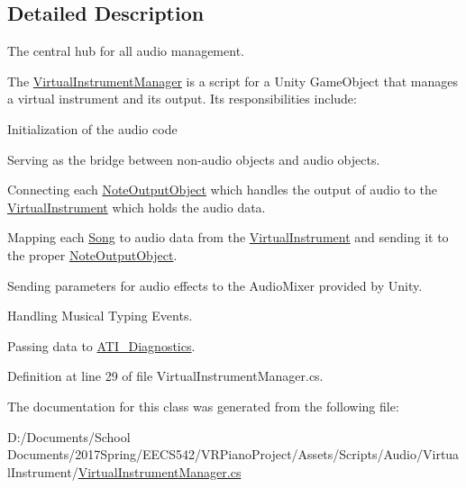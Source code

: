\subsection{Detailed Description}
The central hub for all audio management. 

The \hyperlink{class_virtual_instrument_manager}{Virtual\+Instrument\+Manager} is a script for a Unity Game\+Object that manages a virtual instrument and its output. Its responsibilities include\+: \begin{DoxyItemize}
\item Initialization of the audio code \item Serving as the bridge between non-\/audio objects and audio objects. \item Connecting each \hyperlink{class_note_output_object}{Note\+Output\+Object} which handles the output of audio to the \hyperlink{class_virtual_instrument}{Virtual\+Instrument} which holds the audio data. \item Mapping each \hyperlink{class_song}{Song} to audio data from the \hyperlink{class_virtual_instrument}{Virtual\+Instrument} and sending it to the proper \hyperlink{class_note_output_object}{Note\+Output\+Object}. \item Sending parameters for audio effects to the Audio\+Mixer provided by Unity. \item Handling Musical Typing Events. \item Passing data to \hyperlink{group___audio_testing_class_a_t_i___diagnostics}{A\+T\+I\+\_\+\+Diagnostics}. \end{DoxyItemize}


Definition at line 29 of file Virtual\+Instrument\+Manager.\+cs.



The documentation for this class was generated from the following file\+:\begin{DoxyCompactItemize}
\item 
D\+:/\+Documents/\+School Documents/2017\+Spring/\+E\+E\+C\+S542/\+V\+R\+Piano\+Project/\+Assets/\+Scripts/\+Audio/\+Virtual\+Instrument/\hyperlink{_virtual_instrument_manager_8cs}{Virtual\+Instrument\+Manager.\+cs}\end{DoxyCompactItemize}
